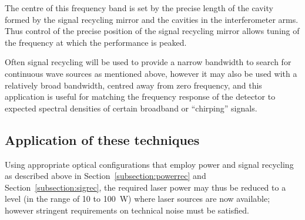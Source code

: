 \documentclass{article}
\begin{document}

The centre of this frequency band is set by the precise length of the cavity
formed by the signal recycling mirror and the cavities in the interferometer
arms. Thus control of the precise position of the signal recycling mirror allows
tuning of the frequency at which the performance is peaked.

Often signal recycling will be used to provide a narrow bandwidth to search for
continuous wave sources as mentioned above, however it may also be used with a
relatively broad bandwidth, centred away from zero frequency, and this
application is useful for matching the frequency response of the detector to
expected spectral densities of certain broadband or ``chirping'' signals.



\subsection{Application of these techniques}
\label{subsection:application}

Using appropriate optical configurations that employ power and signal recycling
as described above in Section~\ref{subsection:powerrec} and
Section~\ref{subsection:sigrec}, the required laser power may thus be reduced
to a level (in the range of 10 to 100~W) where laser sources are now available;
however stringent requirements on technical noise must be satisfied.
\end{document}
